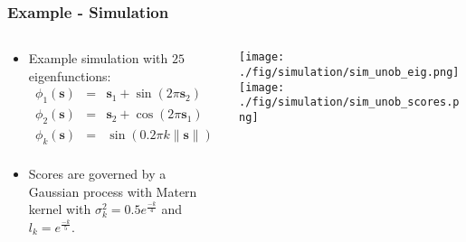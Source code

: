 \documentclass[aspectratio=169]{beamer}
\newcommand{\ve}[1]{\bm{{#1}}}
\begin{document}
  \begin{frame}
    \frametitle{Example - Simulation}
    \begin{columns}
      \begin{column}{0.5\textwidth}
        \begin{itemize}
          \item Example simulation with $25$ eigenfunctions:
            \begin{eqnarray*}
              \phi_1(\ve{s}) & = & \ve{s}_1 + \sin\left( 2 \pi \ve{s}_2 \right) \\
              \phi_2(\ve{s}) & = & \ve{s}_2 + \cos\left( 2 \pi \ve{s}_1 \right) \\
              \phi_k(\ve{s}) & = & \sin(0.2 \pi k \lVert \ve{s} \rVert) \\
            \end{eqnarray*}
          \item Scores are governed by a Gaussian process with Matern kernel with $\sigma^2_k = 0.5e^{\frac{-k}{4}}$ and $l_k = e^{\frac{-k}{5}}$.

        \end{itemize}
      \end{column}
      \begin{column}{0.5\textwidth}
        \begin{center}
          \texttt{[image: ./fig/simulation/sim\_unob\_eig.png]}
          \texttt{[image: ./fig/simulation/sim\_unob\_scores.png]}
        \end{center}
      \end{column}
    \end{columns}
  \end{frame}
\end{document}
